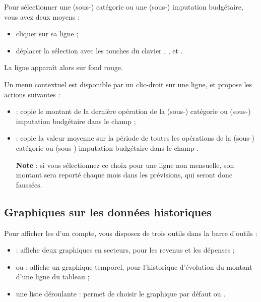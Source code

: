 Pour sélectionner une (sous-) catégorie ou une (sous-) imputation budgétaire, vous avez deux moyens :
\begin{itemize}
	 \item cliquer sur sa ligne ;
	 \item déplacer la sélection avec les touches du clavier , , et .
\end{itemize}
La ligne apparaît alors sur fond rouge{\couleur}.

Un menu contextuel est disponible par un clic-droit sur une ligne, et propose les actions suivantes :
\begin{itemize}
	\item {} : copie  le montant de la dernière opération de la (sous-) catégorie ou (sous-) imputation budgétaire dans le champ  ;
	\item {} : copie la valeur moyenne sur la période de toutes les opérations de la (sous-) catégorie ou (sous-) imputation budgétaire dans le champ .

	\textbf{Note} : si vous sélectionnez ce choix pour une ligne non mensuelle, son montant sera reporté chaque mois dans les prévisions, qui seront donc faussées.
\end{itemize}


\subsection{Graphiques sur les données historiques\label{budget-data-chart}}

Pour afficher les  d'un compte, vous disposez de trois outils dans la barre d'outils : 

\begin{itemize}
	 \item {} : affiche deux graphiques en secteurs, pour les revenus et les dépenses ;
	 \item {} ou  : affiche un graphique temporel, pour l'historique d'évolution du montant d'une ligne du tableau ;
	 \item une liste déroulante : permet de choisir le graphique par défaut  ou .
\end{itemize}


